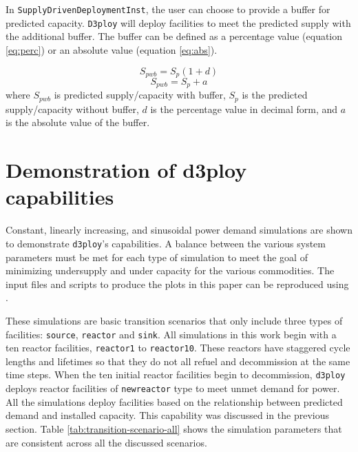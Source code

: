 \documentclass[11pt]{article}
\newcommand{\deploy}{\texttt{d3ploy}\xspace}%
\newcommand{\Deploy}{\texttt{D3ploy}\xspace}%
\begin{document}
In \texttt{SupplyDrivenDeploymentInst}, the user can choose to 
provide a buffer for predicted capacity.
\Deploy will deploy facilities to meet the predicted supply with the 
additional buffer. 
The buffer can be defined as a percentage value (equation \ref{eq:perc}) 
or an absolute value (equation \ref{eq:abs}).  

\begin{equation}
    \label{eq:perc}
    S_{pwb} = S_{p}(1+d)
\end{equation}
\begin{equation}
    \label{eq:abs}
    S_{pwb} = S_{p}+a
\end{equation}
where $S_{pwb}$ is predicted supply/capacity with buffer, 
$S_p$ is the predicted supply/capacity without buffer, 
$d$ is the percentage value in decimal form, 
and $a$ is the absolute value of the buffer. 

\section{Demonstration of d3ploy capabilities}
Constant, linearly increasing, and sinusoidal power demand simulations
are shown to demonstrate \deploy's capabilities. 
A balance between the various system parameters must be 
met for each type of simulation to meet the goal of 
minimizing undersupply and under capacity for the various 
commodities. 
The input files and scripts to produce the plots in this paper 
can be reproduced using \cite{d3ploy_doi_2019}.

These simulations are basic transition scenarios that only include
three types of facilities: \texttt{source}, \texttt{reactor} and 
\texttt{sink}.
All simulations in this work begin with a ten reactor facilities, 
\texttt{reactor1} to \texttt{reactor10}. 
These reactors have staggered cycle lengths and lifetimes 
so that they do not all refuel and decommission at the same time 
steps. 
When the ten initial reactor facilities begin to decommission, 
\deploy deploys reactor facilities of \texttt{newreactor} type
to meet unmet demand for power. 
All the simulations deploy facilities based on the relationship
between predicted demand and installed capacity. 
This capability was discussed in the previous section.  
Table \ref{tab:transition-scenario-all} shows the simulation 
parameters that are consistent across all the discussed 
scenarios. 
\end{document}
